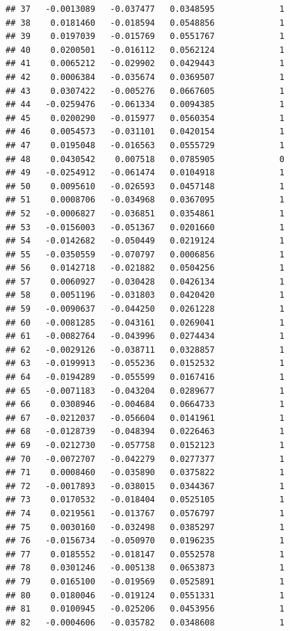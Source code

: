 \documentclass[12pt]{article}\usepackage[]{graphicx}\usepackage[]{xcolor}
\makeatletter
\newenvironment{kframe}{%
 \def\at@end@of@kframe{}%
 \ifinner\ifhmode%
  \def\at@end@of@kframe{\end{minipage}}%
  \begin{minipage}{\columnwidth}%
 \fi\fi%
 \def\FrameCommand##1{\hskip\@totalleftmargin \hskip-\fboxsep
 \colorbox{shadecolor}{##1}\hskip-\fboxsep
     \hskip-\linewidth \hskip-\@totalleftmargin \hskip\columnwidth}%
 \MakeFramed {\advance\hsize-\width
   \@totalleftmargin\z@ \linewidth\hsize
   \@setminipage}}%
 {\par\unskip\endMakeFramed%
 \at@end@of@kframe}
\newenvironment{knitrout}{}{} %
\makeatother
\begin{document}
\begin{knitrout}
\begin{kframe}
\begin{verbatim}
## 37   -0.0013089   -0.037477   0.0348595             1
## 38    0.0181460   -0.018594   0.0548856             1
## 39    0.0197039   -0.015769   0.0551767             1
## 40    0.0200501   -0.016112   0.0562124             1
## 41    0.0065212   -0.029902   0.0429443             1
## 42    0.0006384   -0.035674   0.0369507             1
## 43    0.0307422   -0.005276   0.0667605             1
## 44   -0.0259476   -0.061334   0.0094385             1
## 45    0.0200290   -0.015977   0.0560354             1
## 46    0.0054573   -0.031101   0.0420154             1
## 47    0.0195048   -0.016563   0.0555729             1
## 48    0.0430542    0.007518   0.0785905             0
## 49   -0.0254912   -0.061474   0.0104918             1
## 50    0.0095610   -0.026593   0.0457148             1
## 51    0.0008706   -0.034968   0.0367095             1
## 52   -0.0006827   -0.036851   0.0354861             1
## 53   -0.0156003   -0.051367   0.0201660             1
## 54   -0.0142682   -0.050449   0.0219124             1
## 55   -0.0350559   -0.070797   0.0006856             1
## 56    0.0142718   -0.021882   0.0504256             1
## 57    0.0060927   -0.030428   0.0426134             1
## 58    0.0051196   -0.031803   0.0420420             1
## 59   -0.0090637   -0.044250   0.0261228             1
## 60   -0.0081285   -0.043161   0.0269041             1
## 61   -0.0082764   -0.043996   0.0274434             1
## 62   -0.0029126   -0.038711   0.0328857             1
## 63   -0.0199913   -0.055236   0.0152532             1
## 64   -0.0194289   -0.055599   0.0167416             1
## 65   -0.0071183   -0.043204   0.0289677             1
## 66    0.0308946   -0.004684   0.0664733             1
## 67   -0.0212037   -0.056604   0.0141961             1
## 68   -0.0128739   -0.048394   0.0226463             1
## 69   -0.0212730   -0.057758   0.0152123             1
## 70   -0.0072707   -0.042279   0.0277377             1
## 71    0.0008460   -0.035890   0.0375822             1
## 72   -0.0017893   -0.038015   0.0344367             1
## 73    0.0170532   -0.018404   0.0525105             1
## 74    0.0219561   -0.013767   0.0576797             1
## 75    0.0030160   -0.032498   0.0385297             1
## 76   -0.0156734   -0.050970   0.0196235             1
## 77    0.0185552   -0.018147   0.0552578             1
## 78    0.0301246   -0.005138   0.0653873             1
## 79    0.0165100   -0.019569   0.0525891             1
## 80    0.0180046   -0.019124   0.0551331             1
## 81    0.0100945   -0.025206   0.0453956             1
## 82   -0.0004606   -0.035782   0.0348608             1

\end{verbatim}
\end{kframe}
\end{knitrout}
\end{document}
